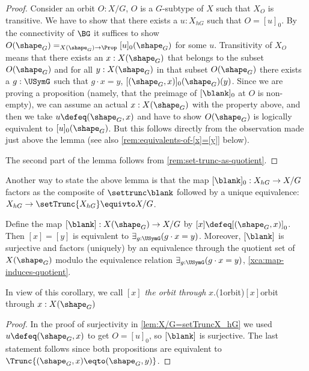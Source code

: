 \begin{proof}
  Consider an orbit $O:X/G$, \ie
  $O$ is a $G$-subtype of $X$ such that $X_O$ is transitive. 
  We have to show that there exists a $u:X_{hG}$ such that $O=[u]_0$.
  By the connectivity of $\BG$ it suffices to show 
  $O(\sh_G)=_{X(\sh_G)\to\Prop}[u]_0(\sh_G)$ for some $u$.
  Transitivity of $X_O$ means that there exists an $x:X(\sh_G)$
  that belongs to the subset $O(\sh_G)$ and for all $y:X(\sh_G)$ in that subset
  $O(\sh_G)$ there
  exists a $g:\USymG$ such that $g\cdot x = y$, \ie $[(\sh_G,x)]_0(\sh_G)(y)$.
  Since we are proving a proposition (namely, that the preimage of $[\blank]_0$
  at $O$ is non-empty), we can assume an actual $x:X(\sh_G)$ with the property
  above, and then we take $u\defeq(\sh_G,x)$ and have to show $O(\sh_G)$ is logically equivalent to
  $[u]_0(\sh_G)$. But this follows directly
  from the observation made just above the lemma (see also
  \cref{rem:equivalents-of-[x]=[y]} below).
  
  The second part of the lemma follows from \cref{rem:set-trunc-as-quotient}. 
\end{proof}

Another way to state the above lemma is that the map 
$[\blank]_0 :X_{hG}\to X/G$ factors as the composite of $\settrunc\blank$
followed by a unique equivalence: $X_{hG}\to \setTrunc{X_{hG}}\equivto X/G$.

\begin{corollary}\label{cor:orbit-equiv}
Define the map $[\blank] : X(\sh_G) \to X/G$ by $[x]\defeq[(\sh_G,x)]_0$.
Then $[x] = [y]$ is equivalent to $\exists_{g:\USymG}(g\cdot x = y)$.
Moreover, $[\blank]$ is surjective and factors (uniquely) 
by an equivalence through the
quotient set of $X(\sh_G)$ modulo the equivalence relation 
$\exists_{g:\USymG}(g\cdot x = y)$, \cf \cref{xca:map-induces-quotient}. 
\end{corollary}

In view of this corollary, we call $[x]$ \emph{the orbit
through} $x$.\glossary(1orbit){$[x]$}{orbit through $x:X(\sh_G)$}
\begin{proof}
In the proof of surjectivity in \cref{lem:X/G=setTruncX_hG} we used
$u\defeq(\sh_G,x)$ to get $O=[u]_0$, so $[\blank]$ is surjective. 
The last statement follows since
both propositions are equivalent to $\Trunc{(\sh_G,x)\eqto(\sh_G,y)}$.
\end{proof}

